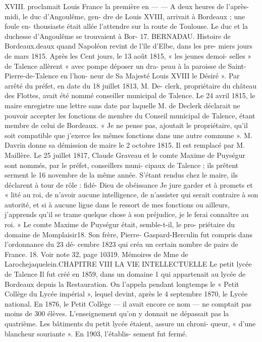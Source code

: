 \documentclass[a4paper,11pt]{book}
\begin{document}
XVIII.
proclamait
Louis
France
la
première
en
—
—
A deux heures de l'après-midi, le duc d'Angoulême, gen-
dre de Louis XVIII, arrivait à Bordeaux ; une foule en-
thousiaste était allée l'attendre sur la route de Toulouse.
Le duc et la duchesse d'Angoulême se trouvaient à Bor-
17. BERNADAU. Histoire de Bordeaux.deaux quand Napoléon revint de l'île d'Elbe, dans les pre-
miers jours de mars 1815.
Après les Cent jours, le 13 août 1815, « les jeunes demoi-
selles » de Talence allèrent « avec pompe déposer un dra-
peau à la paroisse de Saint-Pierre-de-Talence en l'hon-
neur de Sa Majesté Louis XVIII le Désiré ».
Par arrêté du préfet, en date du 18 juillet 1813, M. De-
clerk, propriétaire du château des Flottes, avait été nommé
conseiller municipal de Talence. Le 24 avril 1815, le maire
enregistre une lettre sans date par laquelle M. de Declerk
déclarait ne pouvoir accepter les fonctions de membre du
Conseil municipal de Talence, étant membre de celui de
Bordeaux. « Je ne pense pas, ajoutait le propriétaire, qu'il
soit compatible que j'exerce les mêmes fonctions dans une
autre commune ».
M. Davrin donne sa démission de maire le 2 octobre
1815. Il est remplacé par M. Maillère.
Le 25 juillet 1817, Claude Graveau et le comte Maxime
de Puységur sont nommés, par le préfet, conseillers muni-
cipaux de Talence ; ils prêtent serment le 16 novembre de
la même année. S'étant rendus chez le maire, ils déclarent
à tour de rôle :
fidé-
Dieu
de
obéissance
Je
jure
garder
et
à
promets
et
«
lité au roi, de n'avoir aucune intelligence, de n'assister
qui
serait contraire à son autorité, et si
à aucune ligue
dans le ressort de mes fonctions ou ailleurs, j'apprends
qu'il se trame quelque chose à son préjudice, je le ferai
connaître au roi. »
Le comte Maxime de Puységur était, semble-t-il, le pro-
priétaire du domaine de Momplaisir18. Son frère, Pierre-
Gaspard-Herculin fut compris dans l'ordonnance du 23 dé-
cembre 1823 qui créa un certain nombre de pairs de France.
18. Voir note 32, page 10319. Mémoires de Mme
de Larochejaquelein.CHAPITRE VIII
LA VIE INTELLECTUELLE
Le petit lycée de Talence
Il fut créé en 1859, dans un domaine 1 qui appartenait
au lycée de Bordeaux depuis la Restauration.
On l'appela pendant longtemps le « Petit Collège du
Lycée impérial », lequel devint, après le 4 septembre 1870,
le Lycée national.
En 1876, le Petit Collège — il avait encore ce nom — ne
comptait pas moins de 300 élèves. L'enseignement qu'on y
donnait ne dépassait pas la quatrième.
Les bâtiments du petit lycée étaient, assure un chroni-
queur, « d'une blancheur souriante ». En 1903, l'établis-
sement fut fermé.
\end{document}

